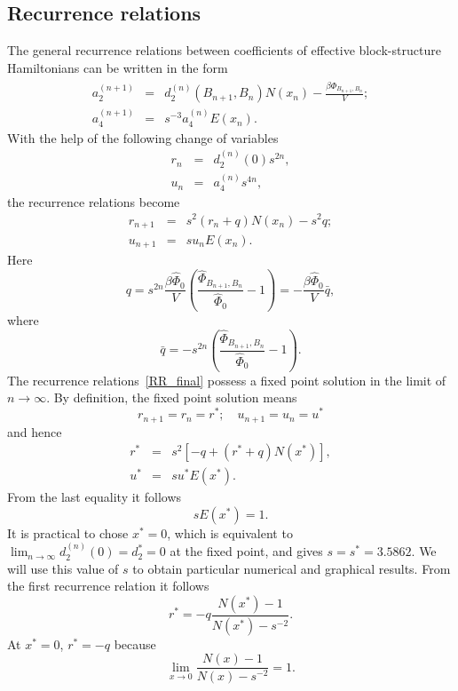 \subsection{Recurrence relations}
The general recurrence relations between coefficients of effective block-structure Hamiltonians can be written in the form
\begin{eqnarray}
	a_2^{(n+1)} & = & d_2^{(n)}(B_{n+1}, B_n) N(x_n) - \frac{\beta\hat{\Phi}_{B_{n+1}, B_n}}{V};
	\\
	a_4^{(n+1)} & = & s^{-3} a_4^{(n)} E(x_{n}).
\end{eqnarray}
With the help of the following change of variables
\begin{eqnarray*}
	r_n & = & d_2^{(n)}(0)s^{2n},
	\nonumber \\
	u_n & = & a_4^{(n)}s^{4n},
	\nonumber
\end{eqnarray*}
the recurrence relations become
\begin{eqnarray}
	\label{RR_final}
	r_{n+1} & = & s^2(r_n + q) N(x_n) - s^2 q;
	\nonumber\\
	u_{n+1} & = & s u_n E(x_n).
\end{eqnarray}
Here
\begin{equation*}
	q = s^{2n} \frac{\beta \hat{\Phi}_0}{V} \left(\frac{\hat{\Phi}_{B_{n+1}, B_n}}{\hat{\Phi}_0} - 1\right) = -\frac{\beta \hat{\Phi}_0}{V} \bar{q},
\end{equation*}
where
\begin{equation*}
	\bar{q} = -s^{2n} \left(\frac{\hat{\Phi}_{B_{n+1}, B_n}}{\hat{\Phi}_0} - 1\right).
\end{equation*}
The recurrence relations~\eqref{RR_final} possess a fixed point solution in the limit of $n \to \infty$. By definition, the fixed point solution means
\begin{equation*}
	r_{n+1} = r_n = r^*; \quad u_{n+1} = u_n = u^*
\end{equation*}
and hence
\begin{eqnarray*}
	r^* & = & s^2[-q + (r^* + q)N(x^*)],
	\nonumber \\
	u^* & = & s u^* E(x^*).
\end{eqnarray*}
From the last equality it follows
\begin{equation*}
	sE(x^*) = 1.
\end{equation*}
It is practical to chose $x^* = 0$, which is equivalent to $\lim_{n \to \infty}d_2^{(n)}(0) = d_2^* = 0$ at the fixed point, and gives $s = s^* = 3.5862$. We will use this value of $s$ to obtain particular numerical and graphical results. From the first recurrence relation it follows
\begin{equation*}
	r^* = -q\frac{N(x^*) - 1}{N(x^*) - s^{-2}}.
\end{equation*}
At $x^* = 0$, $r^* = -q$ because 
$$
\lim_{x \to 0} \frac{N(x) -1}{N(x) - s^{-2}} = 1.
$$ 

